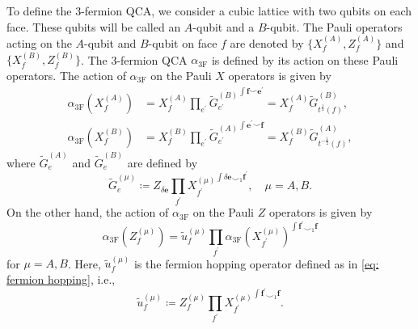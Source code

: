 \documentclass[aps,twocolumn,prx,floatfix,preprintnumbers, nofootinbib,10pt]{revtex4-2}
\numberwithin{equation}{section}
\theoremstyle{definition}
\theoremstyle{remark}
\theoremstyle{claim}
\begin{document}
To define the 3-fermion QCA, we consider a cubic lattice with two qubits on each face.
These qubits will be called an $A$-qubit and a $ B$-qubit.
The Pauli operators acting on the $A$-qubit and $B$-qubit on face $f$ are denoted by $\{X_f^{(A)}, Z_f^{(A)}\}$ and $\{X_f^{(B)}, Z_f^{(B)}\}$.
The 3-fermion QCA $\alpha_\text{3F}$ is defined by its action on these Pauli operators.
The action of $\alpha_\text{3F}$ on the Pauli $X$ operators is given by \cite{Shirley_2022, MengSun2026}
\begin{equation}
\begin{aligned}
\alpha_\text{3F}(X_f^{(A)}) &= X_f^{(A)} \prod_{e^{\prime}} \left. \widetilde{G}_{e^{\prime}}^{(B)} \right.^{\int \bm{f} \smile \bm{e}^{\prime}}
= X_f^{(A)} \widetilde{G}_{t^{\frac{1}{2}}(f)}^{(B)}, \\
\alpha_\text{3F}(X_f^{(B)}) &= X_f^{(B)} \prod_{e^{\prime}} \left. \widetilde{G}_{e^{\prime}}^{(A)} \right.^{\int \bm{e}^{\prime} \smile \bm{f}}
= X_f^{(B)} \widetilde{G}_{t^{-\frac{1}{2}}(f)}^{(A)},
\label{eq: alpha 3F X}
\end{aligned}
\end{equation}
where $\widetilde{G}_e^{(A)}$ and $\widetilde{G}_e^{(B)}$ are defined by
\begin{equation}
\widetilde{G}_e^{(\mu)} \coloneq Z_{\delta \bm{e}} \prod_{f^{\prime}} \left. X_{f^{\prime}}^{(\mu)} \right.^{\int \delta \bm{e} \smile_1 \bm{f}^{\prime}}, \quad
\mu = A, B.
\label{eq: G 3F}
\end{equation}
On the other hand, the action of $\alpha_\text{3F}$ on the Pauli $Z$ operators is given by \cite{Shirley_2022, MengSun2026}
\begin{equation}
\alpha_\text{3F}(Z_f^{(\mu)}) = \tilde{u}_f^{(\mu)} \prod_{f^{\prime}} \alpha_\text{3F}(X_{f^{\prime}}^{(\mu)})^{\int \bm{f}^{\prime} \smile_1 \bm{f}}
\end{equation}
for $\mu = A, B$.
Here, $\tilde{u}_f^{(\mu)}$ is the fermion hopping operator defined as in \eqref{eq: fermion hopping}, i.e.,
\begin{equation}
\tilde{u}_f^{(\mu)} \coloneq Z_f^{(\mu)} \prod_{f^{\prime}} \left. X_{f^{\prime}}^{(\mu)} \right.^{\int \bm{f}^{\prime} \smile_1 \bm{f}}.
\end{equation}
\end{document}
